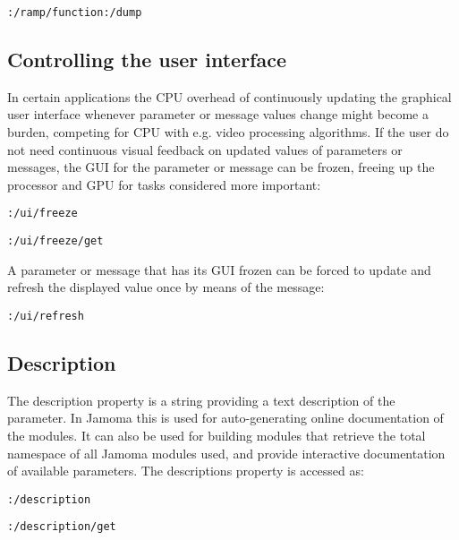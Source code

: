 \documentclass{sig-alternate}
\begin{document}
\texttt{:/ramp/function:/dump}





\subsection{Controlling the user interface} %
\label{sub:controlling_the_user_interface}

In certain applications the CPU overhead of continuously updating the graphical user interface whenever parameter or message values change might become a burden, competing for CPU with e.g. video processing algorithms. If the user do not need continuous visual feedback on updated values of parameters or messages, the GUI for the parameter or message can be frozen, freeing up the processor and GPU for tasks considered more important:

\texttt{:/ui/freeze}

\texttt{:/ui/freeze/get}

A parameter or message that has its GUI frozen can be forced to update and refresh the displayed value once by means of the message:

\texttt{:/ui/refresh}






\subsection{Description} %
\label{sub:description}

The description property is a string providing a text description of the parameter. In Jamoma this is used for auto-generating online documentation of the modules. It can also be used for building modules that retrieve the total namespace of all Jamoma modules used, and provide interactive documentation of available parameters. The descriptions property is accessed as:

\texttt{:/description}

\texttt{:/description/get}

\end{document}
